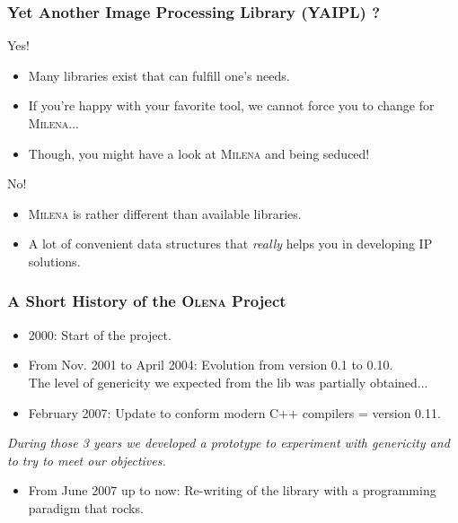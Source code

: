 \documentclass{beamer}
\newcommand{\oln}{\textsc{Olena}\xspace}
\newcommand{\mln}{\textsc{Milena}\xspace}
\begin{document}
\begin{frame}
  \frametitle{Yet Another Image Processing Library (YAIPL) ?}

  \begin{block}{Yes!}
    \begin{itemize}
    \item Many libraries exist that can fulfill one's needs.
    \item If you're happy with your favorite tool, we cannot force you
      to change for \mln...
    \item Though, you might have a look at \mln and being seduced!
    \end{itemize}
    
  \end{block}
 
  \bigskip

  \begin{block}{No!}
    \begin{itemize}
    \item \mln is rather different than available libraries.
    \item A lot of convenient data structures that \emph{really} helps
      you in developing IP solutions.
    \end{itemize}
  \end{block}

\end{frame}


\begin{frame}
  \frametitle{A Short History of the \oln Project}

  {\small
    
  \begin{itemize}
  \item 2000: Start of the project.
  \item From Nov. 2001 to April 2004: Evolution from version 0.1 to 0.10.\\
    The level of genericity we expected from the lib was partially obtained...
  \item February 2007: Update to conform modern C++ compilers = version 0.11.\\
  \end{itemize}

  \medskip

  \textit{During those 3 years we developed a prototype to experiment with
    genericity and to try to meet our objectives.}

  \medskip

  \begin{itemize}
  \item From June 2007 up to now: Re-writing of the library with a
    programming paradigm that rocks.
  \end{itemize}

}%

\end{frame}
\end{document}
